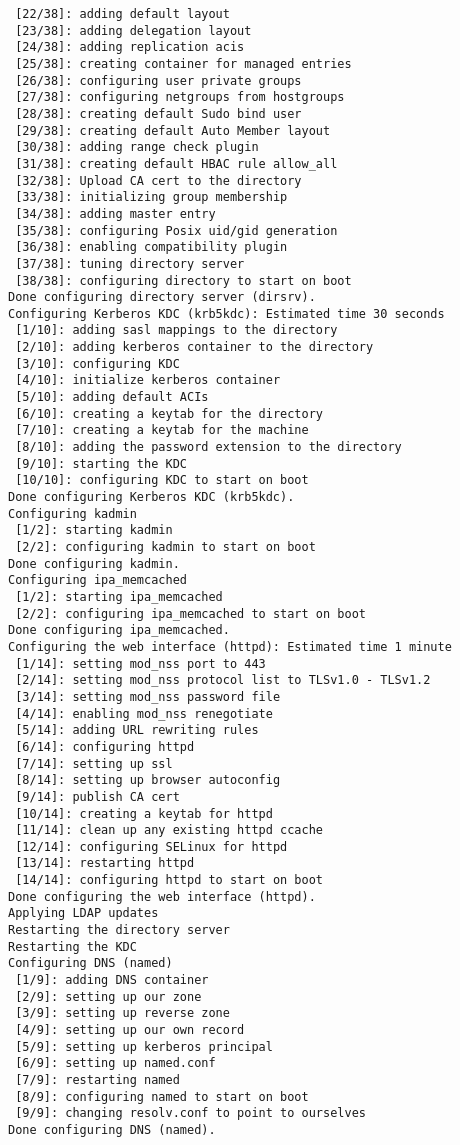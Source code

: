 \documentclass[a4paper,10pt,twoside]{article}
\begin{document}
\begin{verbatim}
 [22/38]: adding default layout
 [23/38]: adding delegation layout
 [24/38]: adding replication acis
 [25/38]: creating container for managed entries
 [26/38]: configuring user private groups
 [27/38]: configuring netgroups from hostgroups
 [28/38]: creating default Sudo bind user
 [29/38]: creating default Auto Member layout
 [30/38]: adding range check plugin
 [31/38]: creating default HBAC rule allow_all
 [32/38]: Upload CA cert to the directory
 [33/38]: initializing group membership
 [34/38]: adding master entry
 [35/38]: configuring Posix uid/gid generation
 [36/38]: enabling compatibility plugin
 [37/38]: tuning directory server
 [38/38]: configuring directory to start on boot
Done configuring directory server (dirsrv).
Configuring Kerberos KDC (krb5kdc): Estimated time 30 seconds
 [1/10]: adding sasl mappings to the directory
 [2/10]: adding kerberos container to the directory
 [3/10]: configuring KDC
 [4/10]: initialize kerberos container
 [5/10]: adding default ACIs
 [6/10]: creating a keytab for the directory
 [7/10]: creating a keytab for the machine
 [8/10]: adding the password extension to the directory
 [9/10]: starting the KDC
 [10/10]: configuring KDC to start on boot
Done configuring Kerberos KDC (krb5kdc).
Configuring kadmin
 [1/2]: starting kadmin
 [2/2]: configuring kadmin to start on boot
Done configuring kadmin.
Configuring ipa_memcached
 [1/2]: starting ipa_memcached
 [2/2]: configuring ipa_memcached to start on boot
Done configuring ipa_memcached.
Configuring the web interface (httpd): Estimated time 1 minute
 [1/14]: setting mod_nss port to 443
 [2/14]: setting mod_nss protocol list to TLSv1.0 - TLSv1.2
 [3/14]: setting mod_nss password file
 [4/14]: enabling mod_nss renegotiate
 [5/14]: adding URL rewriting rules
 [6/14]: configuring httpd
 [7/14]: setting up ssl
 [8/14]: setting up browser autoconfig
 [9/14]: publish CA cert
 [10/14]: creating a keytab for httpd
 [11/14]: clean up any existing httpd ccache
 [12/14]: configuring SELinux for httpd
 [13/14]: restarting httpd
 [14/14]: configuring httpd to start on boot
Done configuring the web interface (httpd).
Applying LDAP updates
Restarting the directory server
Restarting the KDC
Configuring DNS (named)
 [1/9]: adding DNS container
 [2/9]: setting up our zone
 [3/9]: setting up reverse zone
 [4/9]: setting up our own record
 [5/9]: setting up kerberos principal
 [6/9]: setting up named.conf
 [7/9]: restarting named
 [8/9]: configuring named to start on boot
 [9/9]: changing resolv.conf to point to ourselves
Done configuring DNS (named).


\end{verbatim}
\end{document}
